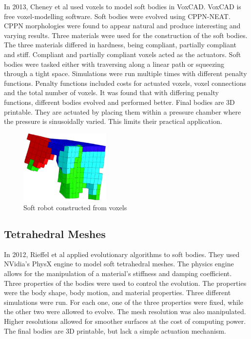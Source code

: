 In 2013, Cheney et al used voxels to model soft bodies in VoxCAD. VoxCAD is free voxel-modelling software. Soft bodies were evolved using CPPN-NEAT. CPPN morphologies were found to appear natural and produce interesting and varying results. Three materials were used for the construction of the soft bodies. The three materials differed in hardness, being compliant, partially compliant and stiff. Compliant and partially compliant voxels acted as the actuators. Soft bodies were tasked either with traversing along a linear path or squeezing through a tight space. Simulations were run multiple times with different penalty functions. Penalty functions included costs for actuated voxels, voxel connections and the total number of voxels. It was found that with differing penalty functions, different bodies evolved and performed better. Final bodies are 3D printable. They are actuated by placing them within a pressure chamber where the pressure is sinusoidally varied. This limits their practical application. \citep{Cheney2013,Cheney2015}

\begin{figure}[H]
	\centering
	\includegraphics[width=0.4\textwidth]{Voxel.png}
	\caption{Soft robot constructed from voxels \citep{Cheney2013}}
	\label{fig:vox}
\end{figure}

\subsection{Tetrahedral Meshes}

In 2012, Rieffel et al applied evolutionary algorithms to soft bodies. They used NVidia's PhysX engine to model soft tetrahedral meshes. The physics engine allows for the manipulation of a material's stiffness and damping coefficient. Three properties of the bodies were used to control the evolution. The properties were the body shape, body motion, and material properties. Three different simulations were run. For each one, one of the three properties were fixed, while the other two were allowed to evolve. The mesh resolution was also manipulated. Higher resolutions allowed for smoother surfaces at the cost of computing power. The final bodies are 3D printable, but lack a simple actuation mechanism. \citep{Rieffel2013}

